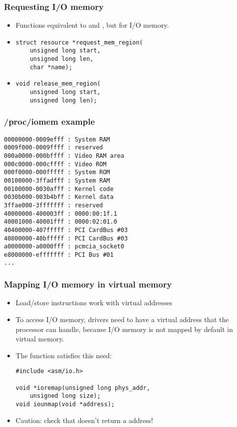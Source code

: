 \begin{frame}[fragile]
  \frametitle{Requesting I/O memory}
  \begin{itemize}
  \item Functions equivalent to  and
    , but for I/O memory.
  \item
\begin{verbatim}
struct resource *request_mem_region(
    unsigned long start,
    unsigned long len,
    char *name);
\end{verbatim}
  \item
\begin{verbatim}
void release_mem_region(
    unsigned long start,
    unsigned long len);
  \end{verbatim}
\end{itemize}
\end{frame}

\begin{frame}[fragile]
  \frametitle{/proc/iomem example}
{\small
\begin{verbatim}
00000000-0009efff : System RAM
0009f000-0009ffff : reserved
000a0000-000bffff : Video RAM area
000c0000-000cffff : Video ROM
000f0000-000fffff : System ROM
00100000-3ffadfff : System RAM
00100000-0030afff : Kernel code
0030b000-003b4bff : Kernel data
3ffae000-3fffffff : reserved
40000000-400003ff : 0000:00:1f.1
40001000-40001fff : 0000:02:01.0
40400000-407fffff : PCI CardBus #03
40800000-40bfffff : PCI CardBus #03
a0000000-a0000fff : pcmcia_socket0
e8000000-efffffff : PCI Bus #01
...
\end{verbatim}
}
\end{frame}

\begin{frame}[fragile]
  \frametitle{Mapping I/O memory in virtual memory}
  \begin{itemize}
  \item Load/store instructions work with virtual addresses
  \item To access I/O memory, drivers need to have a virtual address
    that the processor can handle, because I/O memory is not mapped by
    default in virtual memory.
  \item The  function satisfies this need:
\begin{verbatim}
#include <asm/io.h>

void *ioremap(unsigned long phys_addr,
    unsigned long size);
void iounmap(void *address);
\end{verbatim}
  \item Caution: check that  doesn't return a  address!
  \end{itemize}
\end{frame}

